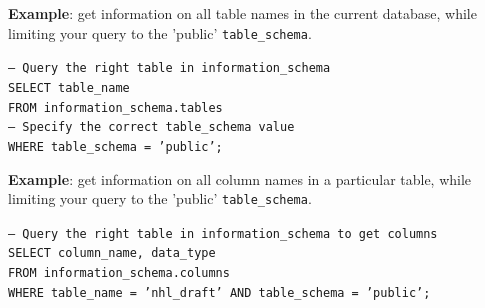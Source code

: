 \documentclass[11pt]{article}
\begin{document}
    \vspace{5mm}

    \textbf{Example}: get information on all table names in the current database, while limiting your query to the 'public' \texttt{table\_schema}.

    \vspace{5mm}

    \texttt{-- Query the right table in information\_schema \\
    SELECT table\_name \\
    FROM information\_schema.tables \\
    -- Specify the correct table\_schema value \\
    WHERE table\_schema = 'public';}

    \vspace{5mm}

    \textbf{Example}: get information on all column names in a particular table, while limiting your query to the 'public' \texttt{table\_schema}.

    \vspace{5mm}

    \texttt{-- Query the right table in information\_schema to get columns \\
    SELECT column\_name, data\_type \\
    FROM information\_schema.columns \\
    WHERE table\_name = 'nhl\_draft' AND table\_schema = 'public';}

    \medskip
    
    
\end{document}
